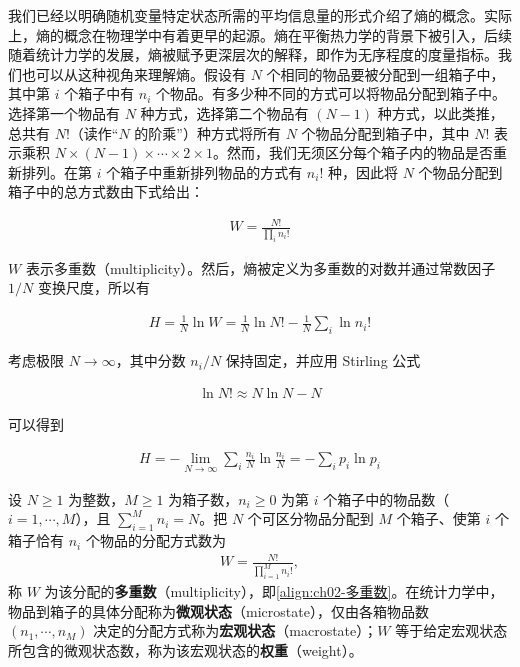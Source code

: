 \documentclass[../../main.tex]{subfiles}
\begin{document}
我们已经以明确随机变量特定状态所需的平均信息量的形式介绍了熵的概念。实际上，熵的概念在物理学中有着更早的起源。熵在平衡热力学的背景下被引入，后续随着统计力学的发展，熵被赋予更深层次的解释，即作为无序程度的度量指标。我们也可以从这种视角来理解熵。假设有 $N$ 个相同的物品要被分配到一组箱子中，其中第 $i$ 个箱子中有 $n_i$ 个物品。有多少种不同的方式可以将物品分配到箱子中。选择第一个物品有 $N$ 种方式，选择第二个物品有 $(N-1)$ 种方式，以此类推，总共有 $N!$（读作“$N$ 的阶乘”）种方式将所有 $N$ 个物品分配到箱子中，其中 $N!$ 表示乘积 $N\times(N-1)\times\cdots\times2\times1$。然而，我们无须区分每个箱子内的物品是否重新排列。在第 $i$ 个箱子中重新排列物品的方式有 $n_i!$ 种，因此将 $N$ 个物品分配到箱子中的总方式数由下式给出：

\begin{align}
  W = \frac{N!}{\prod_i n_i!}
  \label{align:ch02-多重数}
\end{align}

$W$ 表示多重数（multiplicity）。然后，熵被定义为多重数的对数并通过常数因子 $1/N$ 变换尺度，所以有

\begin{align}
  H = \frac{1}{N}\ln W = \frac{1}{N}\ln N! - \frac{1}{N}\sum_i\ln n_i!
  \label{align:ch02-熵与多重数}
\end{align}

考虑极限 $N\to\infty$，其中分数 $n_i/N$ 保持固定，并应用 Stirling 公式

\begin{align}
  \ln N! \approx N\ln N - N
  \label{align:ch02-Stirling}
\end{align}

可以得到

\begin{align}
  H = -\lim_{N\to\infty}\sum_i\frac{n_i}{N}\ln\frac{n_i}{N} = -\sum_i p_i\ln p_i
  \label{align:ch02-熵与概率}
\end{align}

\begin{definition}\label{definition:ch02-多重数}
设 $N\geqslant1$ 为整数，$M\geqslant1$ 为箱子数，$n_i\geqslant0$ 为第 $i$ 个箱子中的物品数（$i=1,\cdots,M$），且 $\sum_{i=1}^{M}n_i=N$。把 $N$ 个可区分物品分配到 $M$ 个箱子、使第 $i$ 个箱子恰有 $n_i$ 个物品的分配方式数为
\begin{align*}
  W=\frac{N!}{\prod_{i=1}^{M}n_i!},
\end{align*}
称 $W$ 为该分配的\textbf{多重数}（multiplicity），即\eqref{align:ch02-多重数}。在统计力学中，物品到箱子的具体分配称为\textbf{微观状态}（microstate），仅由各箱物品数 $(n_1,\cdots,n_M)$ 决定的分配方式称为\textbf{宏观状态}（macrostate）；$W$ 等于给定宏观状态所包含的微观状态数，称为该宏观状态的\textbf{权重}（weight）。
\end{definition}
\end{document}
